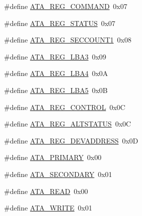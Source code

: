 \begin{DoxyCompactItemize}
\item 
\#define \hyperlink{a00032_a1a54069e05845badff84e1490ca4681e_a1a54069e05845badff84e1490ca4681e}{A\+T\+A\+\_\+\+R\+E\+G\+\_\+\+C\+O\+M\+M\+A\+ND}~0x07
\item 
\#define \hyperlink{a00032_a3b532ef33b38be16a240f8f2e21bc5db_a3b532ef33b38be16a240f8f2e21bc5db}{A\+T\+A\+\_\+\+R\+E\+G\+\_\+\+S\+T\+A\+T\+US}~0x07
\item 
\#define \hyperlink{a00032_a8a9a19e403cdc08cdb52ac4a77d44b1d_a8a9a19e403cdc08cdb52ac4a77d44b1d}{A\+T\+A\+\_\+\+R\+E\+G\+\_\+\+S\+E\+C\+C\+O\+U\+N\+T1}~0x08
\item 
\#define \hyperlink{a00032_af95cf3177ed01e63c3e2783f71e3bfb8_af95cf3177ed01e63c3e2783f71e3bfb8}{A\+T\+A\+\_\+\+R\+E\+G\+\_\+\+L\+B\+A3}~0x09
\item 
\#define \hyperlink{a00032_a39c9e21fd98a8933142af12c472ffb80_a39c9e21fd98a8933142af12c472ffb80}{A\+T\+A\+\_\+\+R\+E\+G\+\_\+\+L\+B\+A4}~0x0A
\item 
\#define \hyperlink{a00032_a24546e89863608bb2850a6ab39a24693_a24546e89863608bb2850a6ab39a24693}{A\+T\+A\+\_\+\+R\+E\+G\+\_\+\+L\+B\+A5}~0x0B
\item 
\#define \hyperlink{a00032_acd25672516342decdb4acb14b13dfa03_acd25672516342decdb4acb14b13dfa03}{A\+T\+A\+\_\+\+R\+E\+G\+\_\+\+C\+O\+N\+T\+R\+OL}~0x0C
\item 
\#define \hyperlink{a00032_a051769d4520d201d24bbb06758a5c1de_a051769d4520d201d24bbb06758a5c1de}{A\+T\+A\+\_\+\+R\+E\+G\+\_\+\+A\+L\+T\+S\+T\+A\+T\+US}~0x0C
\item 
\#define \hyperlink{a00032_adf8b096ca00ce8ce58af3dd79240b2e5_adf8b096ca00ce8ce58af3dd79240b2e5}{A\+T\+A\+\_\+\+R\+E\+G\+\_\+\+D\+E\+V\+A\+D\+D\+R\+E\+SS}~0x0D
\item 
\#define \hyperlink{a00032_aa18f254fa4afcfdb5fcf897eeaf38564_aa18f254fa4afcfdb5fcf897eeaf38564}{A\+T\+A\+\_\+\+P\+R\+I\+M\+A\+RY}~0x00
\item 
\#define \hyperlink{a00032_ad514d776b09e8b873aa7087ef0091fe6_ad514d776b09e8b873aa7087ef0091fe6}{A\+T\+A\+\_\+\+S\+E\+C\+O\+N\+D\+A\+RY}~0x01
\item 
\#define \hyperlink{a00032_a061cf4fd71859d6355aea5be3bae767a_a061cf4fd71859d6355aea5be3bae767a}{A\+T\+A\+\_\+\+R\+E\+AD}~0x00
\item 
\#define \hyperlink{a00032_a9a19b84aa7a02ac7e07528795816ffb2_a9a19b84aa7a02ac7e07528795816ffb2}{A\+T\+A\+\_\+\+W\+R\+I\+TE}~0x01
\end{DoxyCompactItemize}

